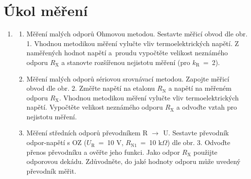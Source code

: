 \documentclass[a4paper,12pt]{article}   %
\newcommand{\tohm}{$\Omega$}
\newcommand{\var}[2]{$#1_\text{#2}$}
\begin{document}
\section{Úkol měření}
\label{chap:ukol}
\begin{enumerate}
    \item 
    \begin{enumerate}[label=\alph*)]
        \item Měření malých odporů Ohmovou metodou. Sestavte měřicí obvod dle obr. 1. Vhodnou metodikou měření vylučte vliv termoelektrických napětí. Z naměřených hodnot napětí a~proudu vypočtěte velikost neznámého odporu \var{R}{X} a stanovte rozšířenou nejistotu měření (pro \var{k}{R}~=~2).
        \item Měření malých odporů sériovou srovnávací metodou. Zapojte měřicí obvod dle obr. 2. Změřte napětí na etalonu \var{R}{N} a napětí na měřeném odporu \var{R}{X}. Vhodnou metodikou měření vylučte vliv termoelektrických napětí. Vypočtěte velikost neznámého odporu \var{R}{X} a odvoďte vztah pro nejistotu měření.
        \item Měření středních odporů převodníkem R \var{\rightarrow}{} U. Sestavte převodník odpor-napětí s OZ (\var{U}{R}~=~10 V, \var{R}{N1}~=~10 k\tohm ) dle obr. 3. Odvoďte přenos převodníku a ověřte jeho funkci. Jako odpor \var{R}{X} použijte odporovou dekádu. Zdůvodněte, do jaké hodnoty odporu může uvedený převodník měřit.
    \end{enumerate}
\end{enumerate}
\end{document}
